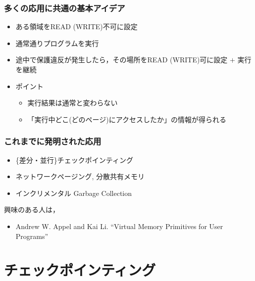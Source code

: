 \documentclass[12pt,dvipdfmx]{beamer}
\begin{document}
\begin{frame}
  \frametitle{多くの応用に共通の基本アイデア}
  \begin{itemize}
  \item ある領域をREAD (WRITE)不可に設定
  \item 通常通りプログラムを実行
  \item 途中で保護違反が発生したら，その場所をREAD (WRITE)可に設定 $+$ 実行を継続
  \item ポイント
    \begin{itemize}
    \item 実行結果は通常と変わらない
    \item 「実行中どこ(どのページ)にアクセスしたか」の情報が得られる
    \end{itemize}
  \end{itemize}
\end{frame}


\begin{frame}
  \frametitle{これまでに発明された応用}
  \begin{itemize}
  \item \{差分・並行\}チェックポインティング
  \item ネットワークページング, 分散共有メモリ
  \item インクリメンタル Garbage Collection
  \end{itemize}
  興味のある人は，
  \begin{itemize}
  \item  Andrew W. Appel and Kai Li. ``Virtual Memory Primitives for User Programs''
  \end{itemize}
\end{frame}


\section{チェックポインティング}
\end{document}
